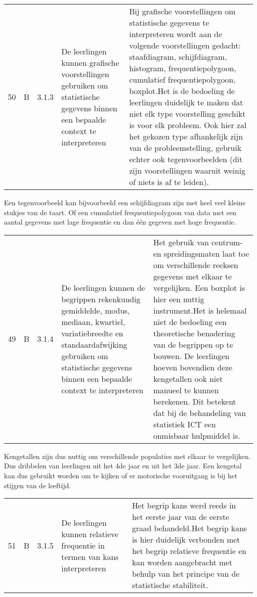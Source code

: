 \documentclass[11pt]{article}
\begin{document}
\begin{tabular}{l|l|l|p{6cm}|p{7cm}}
  50 & B & 3.1.3 & De leerlingen kunnen grafische voorstellingen gebruiken om statistische gegevens binnen een bepaalde context te interpreteren & Bij grafische voorstellingen om statistische gegevens te interpreteren wordt aan de volgende voorstellingen gedacht: staafdiagram, schijfdiagram, histogram, frequentiepolygoon, cumulatief frequentiepolygoon, boxplot.\newline\newline Het is de bedoeling de leerlingen duidelijk te maken dat niet elk type voorstelling geschikt is voor elk probleem. Ook hier zal het gekozen type afhankelijk zijn van de probleemstelling, gebruik echter ook tegenvoorbeelden (dit zijn voorstellingen waaruit weinig of niets is af
te leiden).\\
\end{tabular}

Een tegenvoorbeeld kan bijvoorbeeld een schijfdiagram zijn met heel veel kleine stukjes van de taart. Of een cumulatief frequentiepolygoon van data met een aantal gegevens met lage frequentie en dan één gegeven met hoge frequentie.

\begin{tabular}{l|l|l|p{6cm}|p{7cm}}
  49 & B & 3.1.4 & De leerlingen kunnen de begrippen rekenkundig gemiddelde, modus, mediaan, kwartiel, variatiebreedte en standaardafwijking gebruiken om statistische gegevens binnen een bepaalde context te interpreteren &  Het gebruik van centrum- en spreidingsmaten laat toe om verschillende reeksen gegevens met elkaar te vergelijken. Een boxplot is hier een nuttig instrument.\newline\newline Het is helemaal niet de bedoeling een theoretische benadering van
de begrippen op te bouwen. De leerlingen hoeven bovendien deze kengetallen ook niet manueel te kunnen berekenen. Dit betekent dat bij de behandeling van statistiek ICT een onmisbaar hulpmiddel is.\\
\end{tabular}

Kengetallen zijn dus nuttig om verschillende populaties met elkaar te vergelijken. Dus dribbelen van leerlingen uit het 4de jaar en uit het 3de jaar. Een kengetal kan dus gebruikt worden om te kijken of er motorische vooruitgang is bij het stijgen van de leeftijd.

\begin{tabular}{l|l|l|p{6cm}|p{7cm}}
  51 & B & 3.1.5 & De leerlingen kunnen relatieve frequentie in termen van kans interpreteren & Het begrip kans werd reeds in het eerste jaar van de eerste graad
behandeld.\newline\newline Het begrip kans is hier duidelijk verbonden met het begrip relatieve frequentie en kan worden aangebracht met behulp van het principe van de statistische stabiliteit. \\
\end{tabular}
\end{document}
